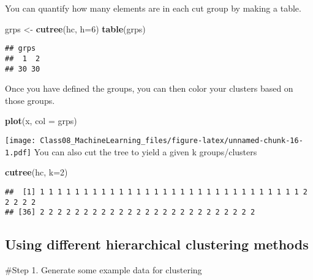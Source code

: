 \documentclass[]{article}
\newenvironment{Shaded}{\begin{snugshade}}{\end{snugshade}}
\newcommand{\DataTypeTok}[1]{\textcolor[rgb]{0.13,0.29,0.53}{#1}}
\newcommand{\DecValTok}[1]{\textcolor[rgb]{0.00,0.00,0.81}{#1}}
\newcommand{\KeywordTok}[1]{\textcolor[rgb]{0.13,0.29,0.53}{\textbf{#1}}}
\newcommand{\NormalTok}[1]{#1}
\newcommand{\StringTok}[1]{\textcolor[rgb]{0.31,0.60,0.02}{#1}}
\begin{document}
You can quantify how many elements are in each cut group by making a
table.

\begin{Shaded}
\begin{Highlighting}[]
\NormalTok{grps <-}\StringTok{ }\KeywordTok{cutree}\NormalTok{(hc, }\DataTypeTok{h=}\DecValTok{6}\NormalTok{)}
\KeywordTok{table}\NormalTok{(grps)}
\end{Highlighting}
\end{Shaded}

\begin{verbatim}
## grps
##  1  2 
## 30 30
\end{verbatim}

Once you have defined the groups, you can then color your clusters based
on those groups.

\begin{Shaded}
\begin{Highlighting}[]
\KeywordTok{plot}\NormalTok{(x, }\DataTypeTok{col =}\NormalTok{ grps)}
\end{Highlighting}
\end{Shaded}

\texttt{[image: Class08\_MachineLearning\_files/figure-latex/unnamed-chunk-16-1.pdf]}
You can also cut the tree to yield a given k groups/clusters

\begin{Shaded}
\begin{Highlighting}[]
\KeywordTok{cutree}\NormalTok{(hc, }\DataTypeTok{k=}\DecValTok{2}\NormalTok{)}
\end{Highlighting}
\end{Shaded}

\begin{verbatim}
##  [1] 1 1 1 1 1 1 1 1 1 1 1 1 1 1 1 1 1 1 1 1 1 1 1 1 1 1 1 1 1 1 2 2 2 2 2
## [36] 2 2 2 2 2 2 2 2 2 2 2 2 2 2 2 2 2 2 2 2 2 2 2 2 2
\end{verbatim}

\hypertarget{using-different-hierarchical-clustering-methods}{%
\subsection{Using different hierarchical clustering
methods}\label{using-different-hierarchical-clustering-methods}}

\#Step 1. Generate some example data for clustering
\end{document}
